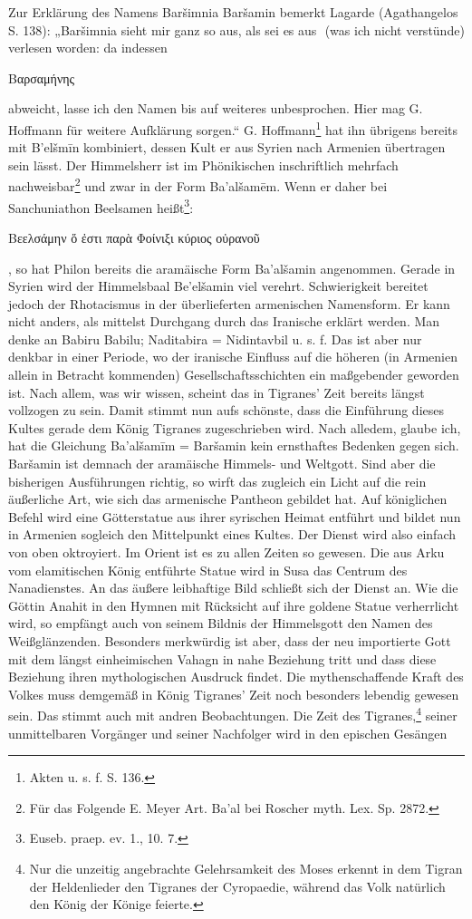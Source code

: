 \documentclass{article}
\newcommand*\svgAAAA{}
\begin{document}
Zur Erklärung des Namens Baršimnia Baršamin bemerkt Lagarde (Agathangelos S. 138): „Baršimnia sieht mir ganz so aus, als sei es aus $\svgAAAA$ (was ich nicht verstünde) verlesen worden: da indessen \begin{greek}Βαρσαμήνης\end{greek} abweicht, lasse ich den Namen bis auf weiteres unbesprochen. Hier mag G. Hoffmann für weitere Aufklärung sorgen.“ G. Hoffmann\footnote{Akten u. s. f. S. 136.} hat ihn übrigens bereits mit B'elšmīn kombiniert, dessen Kult er aus Syrien nach Armenien übertragen sein lässt. Der Himmelsherr ist im Phönikischen inschriftlich mehrfach nachweisbar\footnote{Für das Folgende E. Meyer Art. Ba'al bei Roscher myth. Lex. Sp. 2872.} und zwar in der Form Ba'alšamēm. Wenn er daher bei Sanchuniathon Beelsamen heißt\footnote{Euseb. praep. ev. 1., 10. 7.}: \begin{greek}Βεελσάμην ὅ ἐστι παρὰ Φοίνιξι κύριος οὐρανοῦ\end{greek}, so hat Philon bereits die aramäische Form Ba'alšamin angenommen. Gerade in Syrien wird der Himmelsbaal Be'elšamin viel verehrt. Schwierigkeit bereitet jedoch der Rhotacismus in der überlieferten armenischen Namensform. Er kann nicht anders, als mittelst Durchgang durch das Iranische erklärt werden. Man denke an Babiru Babilu; Naditabira = Nidintavbil u. s. f. Das ist aber nur denkbar in einer Periode, wo der iranische Einfluss auf die höheren (in Armenien allein in Betracht kommenden) Gesellschaftsschichten ein maßgebender geworden ist. Nach allem, was wir wissen, scheint das in Tigranes' Zeit bereits längst vollzogen zu sein. Damit stimmt nun aufs schönste, dass die Einführung dieses Kultes gerade dem König Tigranes zugeschrieben wird. Nach alledem, glaube ich, hat die Gleichung Ba'alšamīm = Baršamin kein ernsthaftes Bedenken gegen sich. Baršamin ist demnach der aramäische Himmels- und Weltgott. Sind aber die bisherigen Ausführungen richtig, so wirft das zugleich ein Licht auf die rein äußerliche Art, wie sich das armenische Pantheon gebildet hat. Auf königlichen Befehl wird eine Götterstatue aus ihrer syrischen Heimat entführt und bildet nun in Armenien sogleich den Mittelpunkt eines Kultes. Der Dienst wird also einfach von oben oktroyiert. Im Orient ist es zu allen Zeiten so gewesen. Die aus Arku vom elamitischen König entführte Statue wird in Susa das Centrum des Nanadienstes. An das äußere leibhaftige Bild schließt sich der Dienst an. Wie die Göttin Anahit in den Hymnen mit Rücksicht auf ihre goldene Statue verherrlicht wird, so empfängt auch von seinem Bildnis der Himmelsgott den Namen des Weißglänzenden. Besonders merkwürdig ist aber, dass der neu importierte Gott mit dem längst einheimischen Vahagn in nahe Beziehung tritt und dass diese Beziehung ihren mythologischen Ausdruck findet. Die mythenschaffende Kraft des Volkes muss demgemäß in König Tigranes' Zeit noch besonders lebendig gewesen sein. Das stimmt auch mit andren Beobachtungen. Die Zeit des Tigranes,\footnote{Nur die unzeitig angebrachte Gelehrsamkeit des Moses erkennt in dem Tigran der Heldenlieder den Tigranes der Cyropaedie, während das Volk natürlich den König der Könige feierte.} seiner unmittelbaren Vorgänger und seiner Nachfolger wird in den epischen Gesängen 
\end{document}
